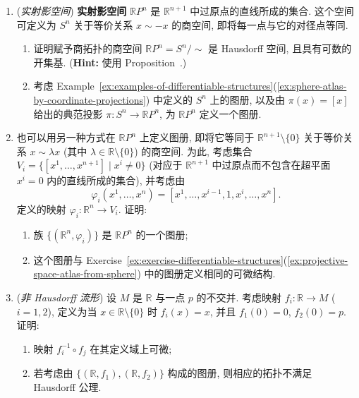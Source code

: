 \begin{RiemannExercise}
\begin{enumerate}[label=(\arabic*),ref=\arabic*,leftmargin=*]
\item\label{ex:projective-space-atlas-from-sphere} (\emph{实射影空间}) \textbf{实射影空间} $\mathbb{R}P^n$ 是 $\mathbb{R}^{n+1}$ 中过原点的直线所成的集合. 这个空间可定义为 $S^n$ 关于等价关系 $x\sim -x$ 的商空间, 即将每一点与它的对径点等同.
\begin{enumerate}[label=(\alph*),leftmargin=*]
\item 证明赋予商拓扑的商空间 $\mathbb{R}P^n=S^n/{\sim}$ 是 Hausdorff 空间, 且具有可数的开集基. (\textbf{Hint:} 使用 Proposition~.)
\item 考虑 Example~\ref{ex:examples-of-differentiable-structures}(\ref{ex:sphere-atlas-by-coordinate-projections}) 中定义的 $S^n$ 上的图册, 以及由 $\pi(x)=[x]$ 给出的典范投影 $\pi:S^n\to\mathbb{R}P^n$, 为 $\mathbb{R}P^n$ 定义一个图册.
\end{enumerate}
\item\label{ex:projective-space-atlas-from-lines} 也可以用另一种方式在 $\mathbb{R}P^n$ 上定义图册, 即将它等同于 $\mathbb{R}^{n+1}\setminus\{0\}$ 关于等价关系 $x\sim\lambda x$ (其中 $\lambda\in\mathbb{R}\setminus\{0\}$) 的商空间. 为此, 考虑集合 $V_i=\{[x^1,\ldots,x^{n+1}]\mid x^i\ne 0\}$ (对应于 $\mathbb{R}^{n+1}$ 中过原点而不包含在超平面 $x^i=0$ 内的直线所成的集合), 并考虑由
\[
  \varphi_i(x^1,\ldots,x^n)=[x^1,\ldots,x^{i-1},1,x^i,\ldots,x^n].
\]
定义的映射 $\varphi_i:\mathbb{R}^n\to V_i$. 证明:
\begin{enumerate}[label=(\alph*),leftmargin=*]
\item 族 $\{(\mathbb{R}^n,\varphi_i)\}$ 是 $\mathbb{R}P^n$ 的一个图册;
\item 这个图册与 Exercise~\ref{ex:exercise-differentiable-structures}(\ref{ex:projective-space-atlas-from-sphere}) 中的图册定义相同的可微结构.
\end{enumerate}
\item\label{ex:non-hausdorff-line-with-two-origins} (\emph{非 Hausdorff 流形}) 设 $M$ 是 $\mathbb{R}$ 与一点 $p$ 的不交并. 考虑映射 $f_i:\mathbb{R}\to M$ ($i=1,2$), 定义为当 $x\in\mathbb{R}\setminus\{0\}$ 时 $f_i(x)=x$, 并且 $f_1(0)=0$, $f_2(0)=p$. 证明:
\begin{enumerate}[label=(\alph*),leftmargin=*]
\item 映射 $f_i^{-1}\circ f_j$ 在其定义域上可微;
\item 若考虑由 $\{(\mathbb{R},f_1),(\mathbb{R},f_2)\}$ 构成的图册, 则相应的拓扑不满足 Hausdorff 公理.
\end{enumerate}
\end{enumerate}
\end{RiemannExercise}

